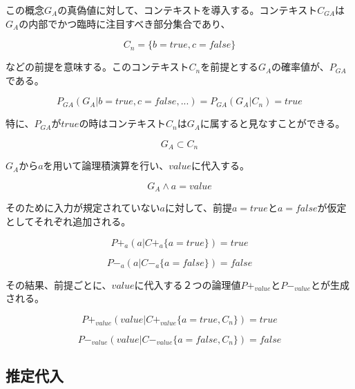 \documentclass[12pt]{article}
\begin{document}
この概念\(G_A\)の真偽値に対して、コンテキストを導入する。コンテキスト\(C_{GA}\)は\(G_A\)の内部でかつ臨時に注目すべき部分集合であり、

\begin{equation}C_n=\{b=true,c=false\}\end{equation}

などの前提を意味する。このコンテキスト\(C_n\)を前提とする\(G_A\)の確率値が、\(P_{GA}\)である。

\begin{equation} P_{GA}(G_A|b=true,c=false,...) = P_{GA}(G_A|C_{n})=true\end{equation}

特に、\(P_{GA}\)が\(true\)の時はコンテキスト\(C_{n}\)は\(G_A\)に属すると見なすことができる。

\begin{equation} G_A \subset C_n\end{equation}

\(G_A\)から\(a\)を用いて論理積演算を行い、\(value\)に代入する。

\begin{equation} G_A \wedge a = value \end{equation}

そのために入力が規定されていない\(a\)に対して、前提\(a=true\)と\(a=false\)が仮定としてそれぞれ追加される。

\begin{equation} P+_{a}(a | C+_{a}\{a=true\})=true \end{equation}

\begin{equation} P-_{a}(a | C-_{a}\{a=false\})=false\end{equation}

その結果、前提ごとに、\(value\)に代入する２つの論理値\(P+_{value}\)と\(P-_{value}\)とが生成される。

\begin{equation} P+_{value}(value | C+_{value}\{a=true,C_n\}) =true \end{equation}

\begin{equation} P-_{value}(value | C-_{value}\{a=false,C_n\}) =false\end{equation}

\subsection{推定代入}\label{ux63a8ux5b9aux4ee3ux5165}
\end{document}
